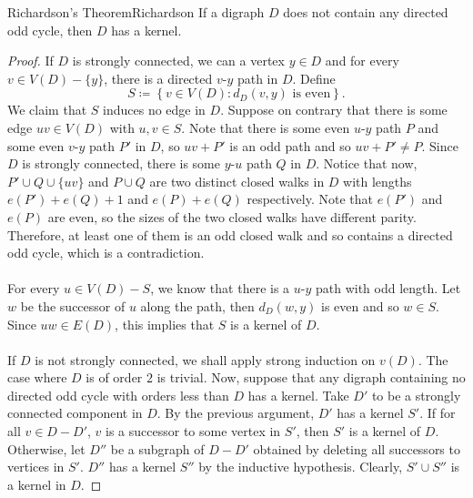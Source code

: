 \documentclass[math, code]{amznotes}
\theoremstyle{remark}
\begin{document}
\begin{thmbox}{Richardson's Theorem}{Richardson}
    If a digraph $D$ does not contain any directed odd cycle, then $D$ has a kernel.
    \tcblower
    \begin{proof}
        If $D$ is strongly connected, we can a vertex $y \in D$ and for every $v \in V(D) - \{y\}$, there is a directed $v$-$y$ path in $D$. Define 
        \begin{equation*}
            S \coloneqq \left\{v \in V(D) \colon d_{D}(v, y) \textrm{ is even}\right\}.
        \end{equation*}
        We claim that $S$ induces no edge in $D$. Suppose on contrary that there is some edge $uv \in V(D)$ with $u, v \in S$. Note that there is some even $u$-$y$ path $P$ and some even $v$-$y$ path $P'$ in $D$, so $uv + P'$ is an odd path and so $uv + P' \neq P$. Since $D$ is strongly connected, there is some $y$-$u$ path $Q$ in $D$. Notice that now, $P' \cup Q \cup \{uv\}$ and $P \cup Q$ are two distinct closed walks in $D$ with lengths $e(P') + e(Q) + 1$ and $e(P) + e(Q)$ respectively. Note that $e(P')$ and $e(P)$ are even, so the sizes of the two closed walks have different parity. Therefore, at least one of them is an odd closed walk and so contains a directed odd cycle, which is a contradiction.
        \\\\
        For every $u \in V(D) - S$, we know that there is a $u$-$y$ path with odd length. Let $w$ be the successor of $u$ along the path, then $d_D(w, y)$ is even and so $w \in S$. Since $uw \in E(D)$, this implies that $S$ is a kernel of $D$.
        \\\\
        If $D$ is not strongly connected, we shall apply strong induction on $v(D)$. The case where $D$ is of order $2$ is trivial. Now, suppose that any digraph containing no directed odd cycle with orders less than $D$ has a kernel. Take $D'$ to be a strongly connected component in $D$. By the previous argument, $D'$ has a kernel $S'$. If for all $v \in D - D'$, $v$ is a successor to some vertex in $S'$, then $S'$ is a kernel of $D$. Otherwise, let $D''$ be a subgraph of $D - D'$ obtained by deleting all successors to vertices in $S'$. $D''$ has a kernel $S''$ by the inductive hypothesis. Clearly, $S' \cup S''$ is a kernel in $D$.
    \end{proof}
\end{thmbox}
\end{document}
